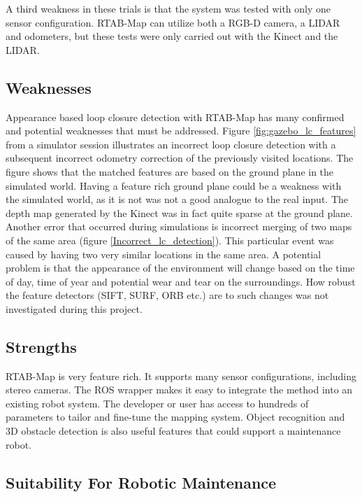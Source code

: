 A third weakness in these trials is that the system was tested with only one sensor configuration. \ac{RTAB-Map} can utilize both a RGB-D camera, a LIDAR and odometers, but these tests were only carried out with the Kinect and the LIDAR.

\subsection{Weaknesses}

Appearance based loop closure detection with \ac{RTAB-Map} has many confirmed and potential weaknesses that must be addressed. Figure \ref{fig:gazebo_lc_features} from a simulator session illustrates an incorrect loop closure detection with a subsequent incorrect odometry correction of the previously visited locations. The figure shows that the matched features are based on the ground plane in the simulated world. Having a feature rich ground plane could be a weakness with the simulated world, as it is not was not a good analogue to the real input. The depth map generated by the Kinect was in fact quite sparse at the ground plane. Another error that occurred during simulations is incorrect merging of two maps of the same area (figure \ref{Incorrect_lc_detection}). This particular event was caused by having two very similar locations in the same area. A potential problem is that the appearance of the environment will change based on the time of day, time of year and potential wear and tear on the surroundings. How robust the feature detectors (\ac{SIFT}, \ac{SURF}, \ac{ORB} etc.) are to such changes was not investigated during this project.

\subsection{Strengths}

\ac{RTAB-Map} is very feature rich. It supports many sensor configurations, including stereo cameras. The \ac{ROS} wrapper makes it easy to integrate the method into an existing robot system. The developer or user has access to hundreds of parameters to tailor and fine-tune the mapping system. Object recognition and 3D obstacle detection is also useful features that could support a maintenance robot.


\subsection{Suitability For Robotic Maintenance}

